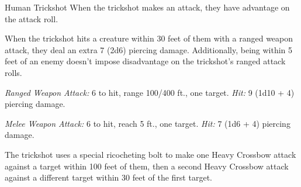 \documentclass[10pt,a4paper,twoside,bg=print,twocolumn,openany,nodeprecatedcode]{dndbook}
\begin{document}
\begin{DndMonster}[float=t]{Human Trickshot}
\DndMonsterBasics[
armor-class = {14},
hit-points = {\DndDice{6d8 + 12}},
speed = {30 ft.}
]
\DndMonsterAbilityScores[
 str = 12,
 dex = 18,
 con = 14,
 int = 10,
 wis = 14,
 cha = 14
]
\DndMonsterDetails[
skills = {Perception +4, Stealth +6},
languages = {Common},
challenge = 2,
]
When the trickshot makes an attack, they have advantage on the attack roll.

When the trickshot hits a creature within 30 feet of them with a ranged weapon attack, they deal an extra 7 (2d6) piercing damage. Additionally, being within 5 feet of an enemy doesn't impose disadvantage on the trickshot's ranged attack rolls.

\textsl{Ranged Weapon Attack:} 6 to hit, range 100/400 ft., one target. \textsl{Hit:} 9 (1d10 + 4) piercing damage.

\textsl{Melee Weapon Attack:} 6 to hit, reach 5 ft., one target. \textsl{Hit:} 7 (1d6 + 4) piercing damage.

The trickshot uses a special ricocheting bolt to make one Heavy Crossbow attack against a target within 100 feet of them, then a second Heavy Crossbow attack against a different target within 30 feet of the first target.

\end{DndMonster}


\clearpage
\end{document}

